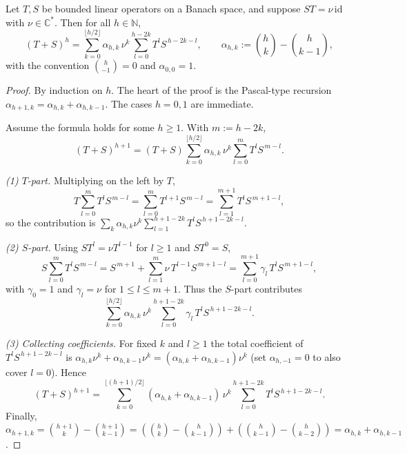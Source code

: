 \documentclass[10pt,a4paper]{amsart}
\newcommand{\C}{{\mathbb{C}}}
\newcommand{\N}{{\mathbb{N}}}
\begin{document}
\begin{lemma}
Let $T,S$ be bounded linear operators on a Banach space, and suppose $ST=\nu\,\mathrm{id}$ with $\nu\in\C^\ast$. Then for all $h\in\N$,
\[
(T+S)^h=\sum_{k=0}^{\lfloor h/2\rfloor}\alpha_{h,k}\,\nu^k\sum_{l=0}^{h-2k}T^l S^{\,h-2k-l},
\qquad
\alpha_{h,k}:=\binom{h}{k}-\binom{h}{k-1},
\]
with the convention $\binom{h}{-1}=0$ and $\alpha_{0,0}=1$.
\end{lemma}

\begin{proof}
By induction on $h$. The heart of the proof is the Pascal-type recursion
$\alpha_{h+1,k}=\alpha_{h,k}+\alpha_{h,k-1}$. The cases $h=0,1$ are immediate.

Assume the formula holds for some $h\ge1$. With $m:=h-2k$,
\[
(T+S)^{h+1}
=(T+S)\sum_{k=0}^{\lfloor h/2\rfloor}\alpha_{h,k}\,\nu^k\sum_{l=0}^{m}T^l S^{\,m-l}.
\]

\emph{(1) $T$-part.} Multiplying on the left by $T$,
\[
T\sum_{l=0}^{m}T^l S^{\,m-l}
=\sum_{l=0}^{m}T^{l+1} S^{\,m-l}
=\sum_{l=1}^{m+1}T^{l} S^{\,m+1-l},
\]
so the contribution is $\sum_{k}\alpha_{h,k}\nu^k\sum_{l=1}^{h+1-2k}T^{l} S^{\,h+1-2k-l}$.

\emph{(2) $S$-part.} Using $ST^l=\nu T^{l-1}$ for $l\ge1$ and $ST^0=S$,
\[
S\sum_{l=0}^{m}T^l S^{\,m-l}
= S^{\,m+1}
+\sum_{l=1}^{m}\nu\,T^{l-1} S^{\,m+1-l}
= \sum_{l=0}^{m+1}\gamma_l\,T^{l} S^{\,m+1-l},
\]
with $\gamma_0=1$ and $\gamma_l=\nu$ for $1\le l\le m+1$. Thus the $S$-part contributes
\[
\sum_{k=0}^{\lfloor h/2\rfloor}\alpha_{h,k}\,\nu^k
\sum_{l=0}^{h+1-2k} \gamma_l\,T^l S^{\,h+1-2k-l}.
\]

\emph{(3) Collecting coefficients.} For fixed $k$ and $l\ge1$ the total coefficient of $T^l S^{\,h+1-2k-l}$
is $\alpha_{h,k}\nu^k+\alpha_{h,k-1}\nu^k=(\alpha_{h,k}+\alpha_{h,k-1})\nu^k$ (set $\alpha_{h,-1}=0$ to also cover $l=0$).
Hence
\[
(T+S)^{h+1}
=\sum_{k=0}^{\lfloor (h+1)/2\rfloor}(\alpha_{h,k}+\alpha_{h,k-1})\,\nu^k
\sum_{l=0}^{h+1-2k}T^l S^{\,h+1-2k-l}.
\]
Finally, $\alpha_{h+1,k}=\binom{h+1}{k}-\binom{h+1}{k-1}
=(\binom{h}{k}-\binom{h}{k-1})+(\binom{h}{k-1}-\binom{h}{k-2})
=\alpha_{h,k}+\alpha_{h,k-1}$.
\end{proof}
\end{document}
